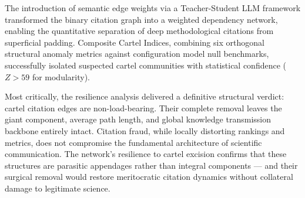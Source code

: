 The introduction of semantic edge weights via a Teacher-Student LLM framework transformed the binary citation graph into a weighted dependency network, enabling the quantitative separation of deep methodological citations from superficial padding. Composite Cartel Indices, combining six orthogonal structural anomaly metrics against configuration model null benchmarks, successfully isolated suspected cartel communities with statistical confidence ($Z > 59$ for modularity).

Most critically, the resilience analysis delivered a definitive structural verdict: cartel citation edges are non-load-bearing. Their complete removal leaves the giant component, average path length, and global knowledge transmission backbone entirely intact. Citation fraud, while locally distorting rankings and metrics, does not compromise the fundamental architecture of scientific communication. The network's resilience to cartel excision confirms that these structures are parasitic appendages rather than integral components --- and their surgical removal would restore meritocratic citation dynamics without collateral damage to legitimate science.


